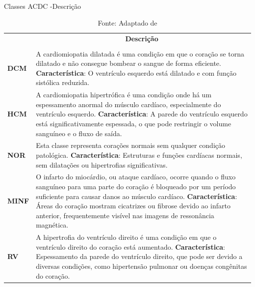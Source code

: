 \begin{table}[hbtp]
    \centering
    \caption{Classes ACDC -Descrição}
    \renewcommand{\arraystretch}{1} %
    \begin{tabular}{|>{\centering\arraybackslash}p{2cm}|p{12cm}|}
    \hline 
          \multicolumn{1}{|c|}{\textbf{Condição}} & \multicolumn{1}{c|}{\textbf{Descrição}} \\
          & \\
    \hline 
        \textbf{DCM} &
        A cardiomiopatia dilatada é uma condição em que o coração se 
        torna dilatado e não consegue bombear o sangue de forma
        eficiente. 
        \newline \newline
        \textbf{Característica}: O ventrículo esquerdo está dilatado e com função sistólica reduzida. \\ 
    \hline
        \textbf{HCM} & 
        A cardiomiopatia hipertrófica é uma condição onde há um espessamento anormal do músculo cardíaco, especialmente do ventrículo esquerdo. 
        \newline \newline
        \textbf{Característica}: A parede do ventrículo esquerdo está significativamente espessada, o que pode restringir o volume sanguíneo e o fluxo de saída. \\ 
    \hline
        \textbf{NOR} & 
        Esta classe representa corações normais sem qualquer condição patológica. 
        \newline \newline
        \textbf{Característica}: Estruturas e funções cardíacas normais, sem dilatações ou hipertrofias significativas. \\ 
    \hline
        \textbf{MINF} & 
        O infarto do miocárdio, ou ataque cardíaco, ocorre quando o fluxo sanguíneo para uma parte do coração é bloqueado por um período suficiente para causar danos ao músculo cardíaco. 
        \newline \newline
        \textbf{Característica}: Áreas do coração mostram cicatrizes ou fibrose devido ao infarto anterior, frequentemente visível nas imagens de ressonância magnética. \\ 
    \hline
        \textbf{RV} & 
        A hipertrofia do ventrículo direito é uma condição em que o ventrículo direito do coração está aumentado. 
        \newline \newline
        \textbf{Característica}: Espessamento da parede do ventrículo direito, que pode ser devido a diversas condições, como hipertensão pulmonar ou doenças congênitas do coração. \\
    \hline
    \end{tabular} 
    \caption*{Fonte: Adaptado de \cite{bernardDeepLearningTechniques2018a}}
    \label{tab:conditions}
\end{table}


